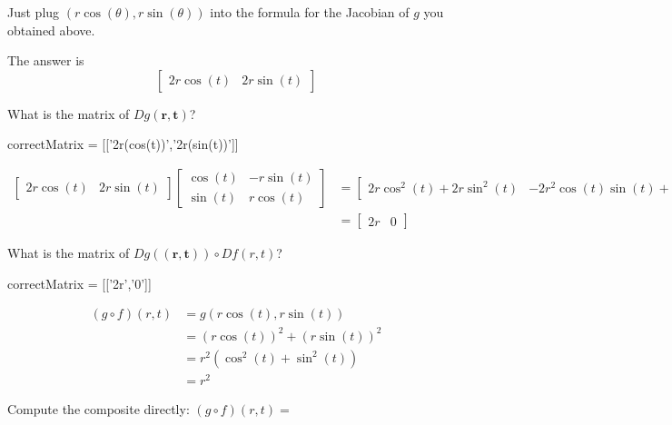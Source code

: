 \documentclass{ximera}
\begin{document}
\begin{question}
	\begin{solution}
		\begin{hint}
			Just plug $(r\cos(\theta),r\sin(\theta))$ into the formula for the Jacobian of $g$ you obtained above.
		\end{hint}
		\begin{hint}
			The answer is \[\begin{bmatrix} 2r\cos(t) &2r\sin(t)\end{bmatrix}\]
		\end{hint}
		What is the matrix of $Dg(\mathbf{r,t})$?
		\begin{matrix-answer}
			correctMatrix = [['2r(cos(t))','2r(sin(t))']]
		\end{matrix-answer}
	\end{solution}
	
	\begin{solution}
		\begin{hint}
			\begin{align*}
			\begin{bmatrix} 2r\cos(t) &2r\sin(t)\end{bmatrix} \begin{bmatrix}  
			\cos(t) & -r\sin(t)
			\\  
			\sin(t) & r\cos(t)
			\end{bmatrix} 
			&= \begin{bmatrix} 2r\cos^2(t) + 2r\sin^2(t)  & -2r^2\cos(t)\sin(t)+2r^2\sin(t)\cos(t) \end{bmatrix}\\
			&= \begin{bmatrix} 2r & 0\end{bmatrix}
			\end{align*}
		\end{hint}
		What is the matrix of $Dg(\mathbf{(r,t)}) \circ Df(r,t)$?
			\begin{matrix-answer}
				correctMatrix = [['2r','0']]
			\end{matrix-answer}
	\end{solution}
	
	\begin{solution}
		\begin{hint}
			\begin{align*}
				(g \circ f)(r,t) &= g(r\cos(t),r\sin(t))\\
				 &=(r\cos(t))^2+(r\sin(t))^2\\
				 &=r^2(\cos^2(t)+\sin^2(t))\\
				 &=r^2
			\end{align*}
		\end{hint}
		Compute the composite directly: $(g \circ f)(r,t) =$\answer{$r^2$}
	\end{solution}
	

\end{question}
\end{document}
